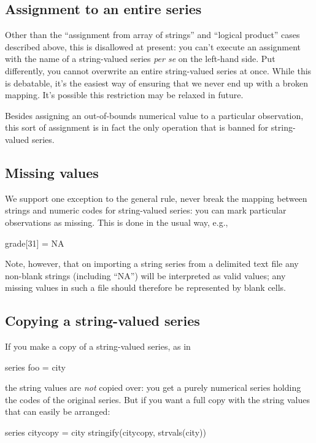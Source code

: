 \subsection{Assignment to an entire series}

Other than the ``assignment from array of strings'' and ``logical
product'' cases described above, this is disallowed at present: you
can't execute an assignment with the name of a string-valued series
\textit{per se} on the left-hand side. Put differently, you cannot
overwrite an entire string-valued series at once. While this is
debatable, it's the easiest way of ensuring that we never end up with
a broken mapping. It's possible this restriction may be relaxed in
future.

Besides assigning an out-of-bounds numerical value to a particular
observation, this sort of assignment is in fact the only operation
that is banned for string-valued series.

\subsection{Missing values}

We support one exception to the general rule, never break the mapping
between strings and numeric codes for string-valued series: you can
mark particular observations as missing. This is done in the usual
way, e.g.,
\begin{code}
grade[31] = NA
\end{code}
Note, however, that on importing a string series from a delimited text
file any non-blank strings (including ``NA'') will be interpreted as
valid values; any missing values in such a file should therefore be
represented by blank cells.

\subsection{Copying a string-valued series}

If you make a copy of a string-valued series, as in
\begin{code}
series foo = city
\end{code}
the string values are \textit{not} copied over: you get a purely
numerical series holding the codes of the original series. But if you
want a full copy with the string values that can easily be arranged:
\begin{code}
series citycopy = city
stringify(citycopy, strvals(city))
\end{code}


